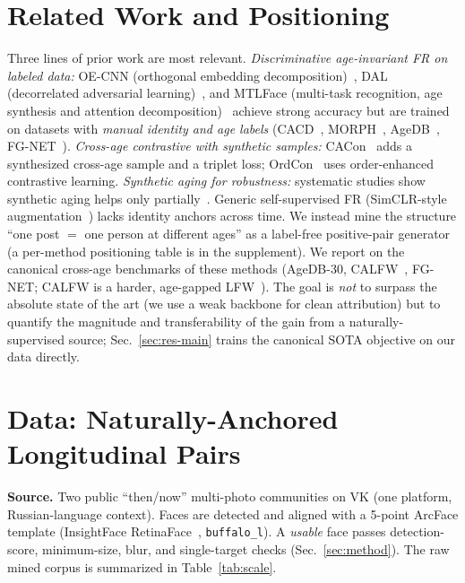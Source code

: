\documentclass[letterpaper]{article} %
\begin{document}
\section{Related Work and Positioning}\label{sec:related}
Three lines of prior work are most relevant. \emph{Discriminative age-invariant FR on labeled data:} OE-CNN (orthogonal embedding decomposition)~\cite{wang2018oecnn}, DAL (decorrelated adversarial learning)~\cite{wang2019dal}, and MTLFace (multi-task recognition, age synthesis and attention decomposition)~\cite{huang2021mtlface} achieve strong accuracy but are trained on datasets with \emph{manual identity and age labels} (CACD~\cite{chen2014cacd}, MORPH~\cite{ricanek2006morph}, AgeDB~\cite{moschoglou2017agedb}, FG-NET~\cite{panis2016fgnet}). \emph{Cross-age contrastive with synthetic samples:} CACon~\cite{wang2024cacon} adds a synthesized cross-age sample and a triplet loss; OrdCon~\cite{wang2025ordcon} uses order-enhanced contrastive learning. \emph{Synthetic aging for robustness:} systematic studies show synthetic aging helps only partially~\cite{yao2024synthageing}. Generic self-supervised FR (SimCLR-style augmentation~\cite{chen2020simclr}) lacks identity anchors across time. We instead mine the structure ``one post $=$ one person at different ages'' as a label-free positive-pair generator (a per-method positioning table is in the supplement). We report on the canonical cross-age benchmarks of these methods (AgeDB-30, CALFW~\cite{zheng2017calfw}, FG-NET; CALFW is a harder, age-gapped LFW~\cite{huang2007lfw}). The goal is \emph{not} to surpass the absolute state of the art (we use a weak backbone for clean attribution) but to quantify the magnitude and transferability of the gain from a naturally-supervised source; Sec.~\ref{sec:res-main} trains the canonical SOTA objective on our data directly.

\section{Data: Naturally-Anchored Longitudinal Pairs}\label{sec:data}
\textbf{Source.} Two public ``then/now'' multi-photo communities on VK (one platform, Russian-language context). Faces are detected and aligned with a 5-point ArcFace template (InsightFace RetinaFace~\cite{deng2020retinaface}, \texttt{buffalo\_l}). A \emph{usable} face passes detection-score, minimum-size, blur, and single-target checks (Sec.~\ref{sec:method}). The raw mined corpus is summarized in Table~\ref{tab:scale}.
\end{document}
